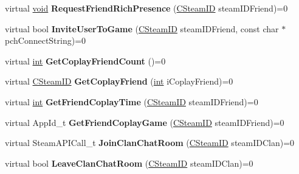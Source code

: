 \begin{DoxyCompactItemize}
\item 
\hypertarget{classISteamFriends_a1812fcaa2a5a567c241aa5c20daab530}{}virtual \hyperlink{SDL__audio_8h_a52835ae37c4bb905b903cbaf5d04b05f}{void} {\bfseries Request\+Friend\+Rich\+Presence} (\hyperlink{classCSteamID}{C\+Steam\+I\+D} steam\+I\+D\+Friend)=0\label{classISteamFriends_a1812fcaa2a5a567c241aa5c20daab530}

\item 
\hypertarget{classISteamFriends_af28a1938dd5d1460f0cf5a9755f60a86}{}virtual bool {\bfseries Invite\+User\+To\+Game} (\hyperlink{classCSteamID}{C\+Steam\+I\+D} steam\+I\+D\+Friend, const char $\ast$pch\+Connect\+String)=0\label{classISteamFriends_af28a1938dd5d1460f0cf5a9755f60a86}

\item 
\hypertarget{classISteamFriends_a80597cb86daf3562602d254754a867f7}{}virtual \hyperlink{SDL__thread_8h_a6a64f9be4433e4de6e2f2f548cf3c08e}{int} {\bfseries Get\+Coplay\+Friend\+Count} ()=0\label{classISteamFriends_a80597cb86daf3562602d254754a867f7}

\item 
\hypertarget{classISteamFriends_a896aad4f362b4d107dbf248cc9dd0fc7}{}virtual \hyperlink{classCSteamID}{C\+Steam\+I\+D} {\bfseries Get\+Coplay\+Friend} (\hyperlink{SDL__thread_8h_a6a64f9be4433e4de6e2f2f548cf3c08e}{int} i\+Coplay\+Friend)=0\label{classISteamFriends_a896aad4f362b4d107dbf248cc9dd0fc7}

\item 
\hypertarget{classISteamFriends_a8cc2fdf1cca9a23cc2c81960cbc84f8f}{}virtual \hyperlink{SDL__thread_8h_a6a64f9be4433e4de6e2f2f548cf3c08e}{int} {\bfseries Get\+Friend\+Coplay\+Time} (\hyperlink{classCSteamID}{C\+Steam\+I\+D} steam\+I\+D\+Friend)=0\label{classISteamFriends_a8cc2fdf1cca9a23cc2c81960cbc84f8f}

\item 
\hypertarget{classISteamFriends_a166e14738d6123a0f6c2f6fdab67377c}{}virtual App\+Id\+\_\+t {\bfseries Get\+Friend\+Coplay\+Game} (\hyperlink{classCSteamID}{C\+Steam\+I\+D} steam\+I\+D\+Friend)=0\label{classISteamFriends_a166e14738d6123a0f6c2f6fdab67377c}

\item 
\hypertarget{classISteamFriends_a2308b85c4d82575ebcf88e0a2a37a030}{}virtual Steam\+A\+P\+I\+Call\+\_\+t {\bfseries Join\+Clan\+Chat\+Room} (\hyperlink{classCSteamID}{C\+Steam\+I\+D} steam\+I\+D\+Clan)=0\label{classISteamFriends_a2308b85c4d82575ebcf88e0a2a37a030}

\item 
\hypertarget{classISteamFriends_ac3aacc8799c95d30fe1c2c95d1747365}{}virtual bool {\bfseries Leave\+Clan\+Chat\+Room} (\hyperlink{classCSteamID}{C\+Steam\+I\+D} steam\+I\+D\+Clan)=0\label{classISteamFriends_ac3aacc8799c95d30fe1c2c95d1747365}


\end{DoxyCompactItemize}
